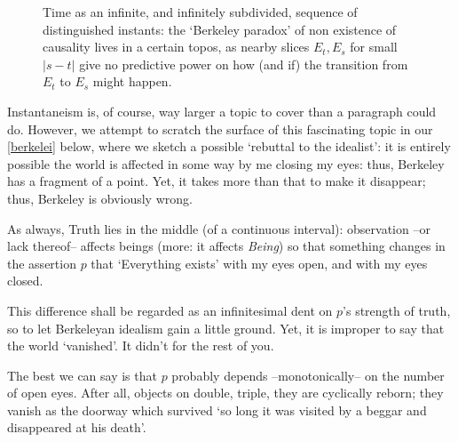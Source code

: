 \begin{example}
\begin{center}
\begin{figure}[h]
			\caption{Time as an infinite, and infinitely subdivided, sequence of distinguished instants: the `Berkeley paradox' of non existence of causality lives in a certain topos, as nearby slices $E_t, E_s$ for small $|s-t|$ give no predictive power on how (and if) the transition from $E_t$ to $E_s$ might happen.}
			\label{fig:berkeley}
		\end{figure}
	\end{center}
\end{example}
Instantaneism is, of course, way larger a topic to cover than a paragraph could do. However, we attempt to scratch the surface of this fascinating topic in our \autoref{berkelei} below, where we sketch a possible `rebuttal to the idealist': it is entirely possible the world is affected in some way by me closing my eyes: thus, Berkeley has a fragment of a point. Yet, it takes more than that to make it disappear; thus, Berkeley is obviously wrong.

As always, Truth lies in the middle (of a continuous interval): observation --or lack thereof-- affects beings (more: it affects \emph{Being}) so that something changes in the assertion $p$ that `Everything exists' with my eyes open, and with my eyes closed.

This difference shall be regarded as an infinitesimal dent on $p$'s strength of truth, so to let Berkeleyan idealism gain a little ground. Yet, it is improper to say that the world `vanished'. It didn't for the rest of you.

The best we can say is that $p$ probably depends --monotonically-- on the number of open eyes. After all, objects on \tlon double, triple, they are cyclically reborn; they vanish as the doorway which survived `so long it was visited by a beggar and disappeared at his death'.